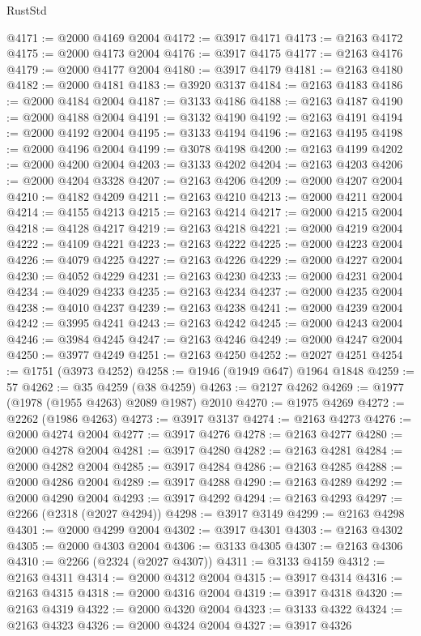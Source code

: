 \begin{lexlean}{RustStd}
\begin{coremodule}
@4171 := @2000 @4169 @2004
@4172 := @3917 @4171
@4173 := @2163 @4172
@4175 := @2000 @4173 @2004
@4176 := @3917 @4175
@4177 := @2163 @4176
@4179 := @2000 @4177 @2004
@4180 := @3917 @4179
@4181 := @2163 @4180
@4182 := @2000 @4181
@4183 := @3920 @3137
@4184 := @2163 @4183
@4186 := @2000 @4184 @2004
@4187 := @3133 @4186
@4188 := @2163 @4187
@4190 := @2000 @4188 @2004
@4191 := @3132 @4190
@4192 := @2163 @4191
@4194 := @2000 @4192 @2004
@4195 := @3133 @4194
@4196 := @2163 @4195
@4198 := @2000 @4196 @2004
@4199 := @3078 @4198
@4200 := @2163 @4199
@4202 := @2000 @4200 @2004
@4203 := @3133 @4202
@4204 := @2163 @4203
@4206 := @2000 @4204 @3328
@4207 := @2163 @4206
@4209 := @2000 @4207 @2004
@4210 := @4182 @4209
@4211 := @2163 @4210
@4213 := @2000 @4211 @2004
@4214 := @4155 @4213
@4215 := @2163 @4214
@4217 := @2000 @4215 @2004
@4218 := @4128 @4217
@4219 := @2163 @4218
@4221 := @2000 @4219 @2004
@4222 := @4109 @4221
@4223 := @2163 @4222
@4225 := @2000 @4223 @2004
@4226 := @4079 @4225
@4227 := @2163 @4226
@4229 := @2000 @4227 @2004
@4230 := @4052 @4229
@4231 := @2163 @4230
@4233 := @2000 @4231 @2004
@4234 := @4029 @4233
@4235 := @2163 @4234
@4237 := @2000 @4235 @2004
@4238 := @4010 @4237
@4239 := @2163 @4238
@4241 := @2000 @4239 @2004
@4242 := @3995 @4241
@4243 := @2163 @4242
@4245 := @2000 @4243 @2004
@4246 := @3984 @4245
@4247 := @2163 @4246
@4249 := @2000 @4247 @2004
@4250 := @3977 @4249
@4251 := @2163 @4250
@4252 := @2027 @4251
@4254 := @1751 (@3973 @4252)
@4258 := @1946 (@1949 @647) @1964 @1848
@4259 := 57
@4262 := @35 @4259 (@38 @4259)
@4263 := @2127 @4262
@4269 := @1977 (@1978 (@1955 @4263) @2089 @1987) @2010
@4270 := @1975 @4269
@4272 := @2262 (@1986 @4263)
@4273 := @3917 @3137
@4274 := @2163 @4273
@4276 := @2000 @4274 @2004
@4277 := @3917 @4276
@4278 := @2163 @4277
@4280 := @2000 @4278 @2004
@4281 := @3917 @4280
@4282 := @2163 @4281
@4284 := @2000 @4282 @2004
@4285 := @3917 @4284
@4286 := @2163 @4285
@4288 := @2000 @4286 @2004
@4289 := @3917 @4288
@4290 := @2163 @4289
@4292 := @2000 @4290 @2004
@4293 := @3917 @4292
@4294 := @2163 @4293
@4297 := @2266 (@2318 (@2027 @4294))
@4298 := @3917 @3149
@4299 := @2163 @4298
@4301 := @2000 @4299 @2004
@4302 := @3917 @4301
@4303 := @2163 @4302
@4305 := @2000 @4303 @2004
@4306 := @3133 @4305
@4307 := @2163 @4306
@4310 := @2266 (@2324 (@2027 @4307))
@4311 := @3133 @4159
@4312 := @2163 @4311
@4314 := @2000 @4312 @2004
@4315 := @3917 @4314
@4316 := @2163 @4315
@4318 := @2000 @4316 @2004
@4319 := @3917 @4318
@4320 := @2163 @4319
@4322 := @2000 @4320 @2004
@4323 := @3133 @4322
@4324 := @2163 @4323
@4326 := @2000 @4324 @2004
@4327 := @3917 @4326

\end{coremodule}
\end{lexlean}
